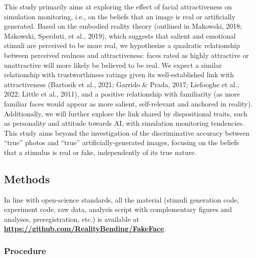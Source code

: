 \documentclass[
  man,floatsintext]{apa6}
\begin{document}
This study primarily aims at exploring the effect of facial attractiveness on simulation monitoring, i.e., on the beliefs that an image is real or artificially generated. Based on the embodied reality theory (outlined in Makowski, 2018; Makowski, Sperduti, et al., 2019), which suggests that salient and emotional stimuli are perceived to be more real, we hypothesize a quadratic relationship between perceived realness and attractiveness: faces rated as highly attractive or unattractive will more likely be believed to be real. We expect a similar relationship with trustworthiness ratings given its well-established link with attractiveness (Bartosik et al., 2021; Garrido \& Prada, 2017; Liefooghe et al., 2022; Little et al., 2011), and a positive relationship with familiarity (as more familiar faces would appear as more salient, self-relevant and anchored in reality). Additionally, we will further explore the link shared by dispositional traits, such as personality and attitude towards AI, with simulation monitoring tendencies. This study aims beyond the investigation of the discriminative accuracy between ``true'' photos and ``true'' artificially-generated images, focusing on the beliefs that a stimulus is real or fake, independently of its true nature.

\hypertarget{methods}{%
\subsection{Methods}\label{methods}}

In line with open-science standards, all the material (stimuli generation code, experiment code, raw data, analysis script with complementary figures and analyses, preregistration, etc.) is available at \href{https://github.com/RealityBending/FakeFace}{\textbf{https://github.com/RealityBending/FakeFace}}.

\hypertarget{procedure}{%
\subsubsection{Procedure}\label{procedure}}
\end{document}
